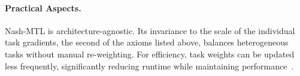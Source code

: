 \paragraph*{Practical Aspects.}
Nash-MTL is architecture-agnostic. Its invariance to the scale of the individual task gradients, the second of the axioms listed above, balances heterogeneous tasks without manual re-weighting. For efficiency, task weights can be updated less frequently, significantly reducing runtime while maintaining performance~\cite{nash}.

